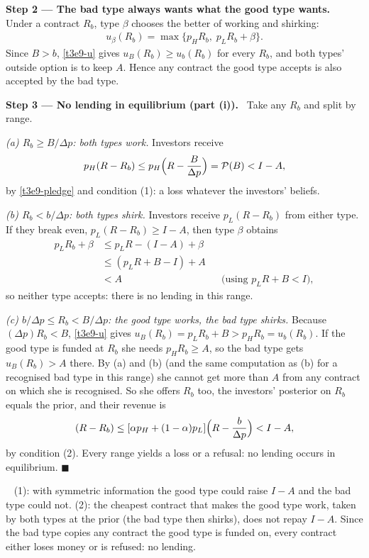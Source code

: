 \documentclass[11pt,a4paper]{article}
\newcommand{\step}[2]{\par\medskip\noindent\textbf{Step #1 --- #2.}~}
\newcommand{\answer}[1]{\par\smallskip\noindent\fbox{\textbf{Answer #1.}}~}
\begin{document}
\step{2}{The bad type always wants what the good type wants} Under a contract $R_b$, type $\beta$
chooses the better of working and shirking:
\begin{align}
  u_\beta(R_b) = \max\{p_HR_b,\; p_LR_b+\beta\}. \label{t3e9-u}
\end{align}
Since $B>b$, \eqref{t3e9-u} gives $u_B(R_b)\ge u_b(R_b)$ for every $R_b$, and both types' outside option is
to keep $A$. Hence any contract the good type accepts is also accepted by the bad type.

\step{3}{No lending in equilibrium (part (i))} Take any $R_b$ and split by range.

\emph{(a) $R_b\ge B/\Delta p$: both types work.} Investors receive
\begin{align}
  p_H(R-R_b) \le p_H\Bigl(R-\frac{B}{\Delta p}\Bigr)=\mathcal{P}(B) < I-A, \nonumber
\end{align}
by \eqref{t3e9-pledge} and condition (1): a loss whatever the investors' beliefs.

\emph{(b) $R_b<b/\Delta p$: both types shirk.} Investors receive $p_L(R-R_b)$ from either type. If they
break even, $p_L(R-R_b)\ge I-A$, then type $\beta$ obtains
\begin{align}
  p_LR_b+\beta &\le p_LR-(I-A)+\beta \nonumber\\
  &\le (p_LR+B-I)+A \nonumber\\
  &< A && \text{(using } p_LR+B<I), \nonumber
\end{align}
so neither type accepts: there is no lending in this range.

\emph{(c) $b/\Delta p\le R_b<B/\Delta p$: the good type works, the bad type shirks.} Because
$(\Delta p)R_b<B$, \eqref{t3e9-u} gives $u_B(R_b)=p_LR_b+B>p_HR_b=u_b(R_b)$. If the good type is funded at
$R_b$ she needs $p_HR_b\ge A$, so the bad type gets $u_B(R_b)>A$ there. By (a) and (b) (and the same
computation as (b) for a recognised bad type in this range) she cannot get more than $A$ from any contract
on which she is recognised. So she offers $R_b$ too, the investors' posterior on $R_b$ equals the prior,
and their revenue is
\begin{align}
  [\alpha p_H+(1-\alpha)p_L](R-R_b)
  \le [\alpha p_H+(1-\alpha)p_L]\Bigl(R-\frac{b}{\Delta p}\Bigr) < I-A, \nonumber
\end{align}
by condition (2). Every range yields a loss or a refusal: no lending occurs in equilibrium.
$\blacksquare$

\answer{(i)} (1): with symmetric information the good type could raise $I-A$ and the bad type could not. (2): the cheapest contract that makes the good type work, taken by both types at the prior (the bad type then shirks), does not repay $I-A$. Since the bad type copies any contract the good type is funded on, every contract either loses money or is refused: no lending.
\end{document}
